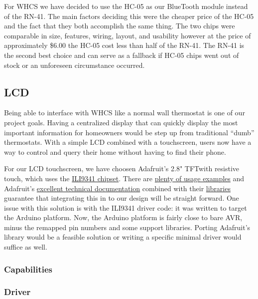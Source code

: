 For WHCS we have decided to use the HC{}-05 as our BlueTooth module instead of
the RN{}-41. The main factors deciding this were the cheaper price of the
HC{}-05 and the fact that they both accomplish the same thing. The two chips
were comparable in size, features, wiring, layout, and usability however at the
price of approximately \$6.00 the HC{}-05 cost less than half of the RN{}-41.
The RN{}-41 is the second best choice and can serve as a fallback if HC{}-05
chips went out of stock or an unforeseen circumstance occurred.

\subsection{LCD}
Being able to interface with WHCS like a normal wall thermostat is one of our
project goals. Having a centralized display that can quickly display the most
important information for homeowners would be step up from traditional ``dumb''
thermostats. With a simple LCD combined with a touchscreen, users now have a
way to control and query their home without having to find their phone.

For our LCD touchscreen, we have choosen Adafruit's 2.8" TFT\footnotemark with
resistive touch, which uses the \href{}{ILI9341 chipset}. There are
\href{https://github.com/adafruit/Adafruit_ILI9341/tree/master/examples}{plenty
of usage examples} and Adafruit's
\href{https://learn.adafruit.com/adafruit-2-dot-8-color-tft-touchscreen-breakout-v2}{excellent
technical documentation} combined with their
\href{https://github.com/adafruit/Adafruit_ILI9341}{libraries} guarantee that
integrating this in to our design will be straight forward. One issue with this
solution is with the ILI9341 driver code: it was written to target the Arduino
platform. Now, the Arduino platform is fairly close to bare AVR, minus the
remapped pin numbers and some support libraries. Porting Adafruit's library
would be a feasible solution or writing a specific minimal driver would suffice
as well.


\subsubsection{Capabilities}

\subsubsection{Driver}

